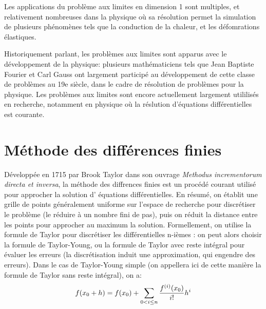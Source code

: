 \documentclass[12pt]{article}
\begin{document}
Les applications du problème aux limites en dimension 1 sont multiples, et relativement nombreuses dans la physique où sa résolution permet la simulation de plusieurs phénomènes tels que la conduction de la chaleur, et les défomrations élastiques.

Historiquement parlant, les problèmes aux limites sont apparus avec le développement de la physique: plusieurs mathématiciens tels que Jean Baptiste Fourier et Carl Gauss ont largement participé au développement de cette classe de problèmes au 19e siècle, dans le cadre de résolution de problèmes pour la physique.
Les problèmes aux limites sont encore actuellement largement utililisés en recherche, notamment en physique où la réslution d'équations différentielles est courante.



\section{Méthode des différences finies}

\quad Développée en 1715 par Brook Taylor dans son ouvrage \emph{Methodus incrementorum directa et inversa}, la méthode des diffrences finies est un procédé courant utilisé pour approcher la solution d' équations différentielles. En résumé, on établit une grille de points généralement uniforme sur l'espace de recherche pour discrétiser le problème (le réduire à un nombre fini de pas), puis on réduit la distance entre les points pour approcher au maximum la solution.
\quad Formellement, on utilise la formule de Taylor pour discrétiser les différentielles n-ièmes : on peut alors choisir la formule de Taylor-Young, ou la formule de Taylor avec reste intégral pour évaluer les erreurs (la discrétisation induit une approximation, qui engendre des erreurs).
Dans le cas de Taylor-Young simple (on appellera ici de cette manière la formule de Taylor sans reste intégral), on a:
$$
f\relax(x_0 + h) = f\relax(x_0) + \sum_{\substack{0<i\le n}}\frac{f^{(i)}\relax(x_0)}{i!}h^i
$$ 
\end{document}
